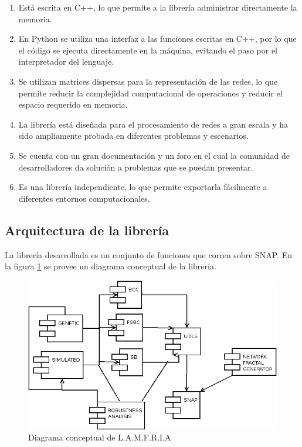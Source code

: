 \begin{enumerate}
    \item Está escrita en C++, lo que permite a la librería administrar directamente la memoria.
    \item En Python se utiliza una interfaz a las funciones escritas en C++, por lo que el código se ejecuta directamente en la máquina, evitando el paso por el interpretador del lenguaje.
    \item Se utilizan matrices dispersas para la representación de las redes, lo que permite reducir la complejidad computacional de operaciones y reducir el espacio requerido en memoria.
    \item La librería está diseñada para el procesamiento de redes a gran escala y ha sido ampliamente probada en diferentes problemas y escenarios.
    \item Se cuenta con un gran documentación y un foro en el cual la comunidad de desarrolladores da solución a problemas que se puedan presentar.
    \item Es una librería independiente, lo que permite exportarla fácilmente a diferentes entornos computacionales.
\end{enumerate}


\subsection{Arquitectura de la librería}

La librería desarrollada es un conjunto de funciones que corren sobre SNAP. En la figura \ref{fig:diagramaConceptual} se provee un diagrama conceptual de la librería.

\begin{figure}[H]
    \centering
    \includegraphics[scale=0.7]{Capitulo7Libreria/imagenes/componentes.png}
    \caption{Diagrama conceptual de L.A.M.F.R.I.A}
    \label{fig:diagramaConceptual}
\end{figure}

